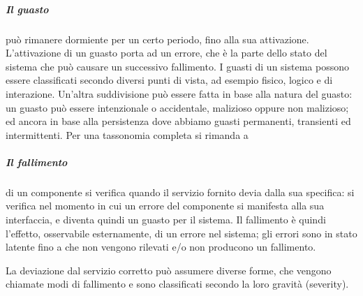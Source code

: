 \documentclass[14pt]{extarticle}
\begin{document}
\subparagraph{Il guasto} può rimanere dormiente per un certo periodo, fino alla sua attivazione. L'attivazione di un guasto porta ad un errore, che è la parte dello
stato del sistema che può causare un successivo fallimento. 
I guasti di un sistema possono essere classificati secondo diversi punti di vista, ad esempio
fisico, logico e di interazione. Un'altra suddivisione può essere fatta in base
alla natura del guasto: un guasto può essere intenzionale o accidentale, malizioso oppure non malizioso; ed ancora in base alla persistenza dove abbiamo
guasti permanenti, transienti ed intermittenti. Per una tassonomia completa
si rimanda a \cite{avizienis2004basic} 

\subparagraph{Il fallimento} di un componente si verifica quando il servizio fornito devia
dalla sua specifica: si verifica nel momento in cui un errore del componente
si manifesta alla sua interfaccia, e diventa quindi un guasto per il sistema. Il
fallimento è quindi l'effetto, osservabile esternamente, di un errore nel sistema; gli errori sono in stato latente fino a che non vengono rilevati e/o non
producono un fallimento.

La deviazione dal servizio corretto può assumere diverse forme, che vengono chiamate modi di fallimento e sono classificati secondo la loro
gravità (severity).
\end{document}
